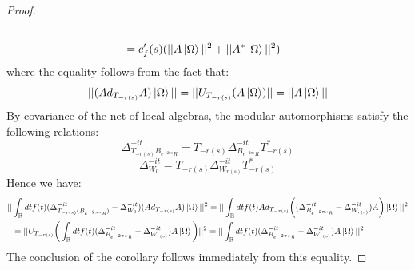 \documentclass[a4paper,11pt]{article}
\theoremstyle{definition}
\begin{document}
{\begin{proof}
\begin{align}
\begin{split}
            \\&
            =c'_f(s)(||A\ket{\Omega}||^2 + ||A^*\ket{\Omega}||^2)
        \end{split}
    \end{align}
    where the equality follows from the fact that:
    \begin{equation}
        ||(Ad_{T_{-r(s)}}A)\ket{\Omega}|| = ||U_{T_{-r(s)}}(A\ket{\Omega})|| = ||A\ket{\Omega}||
    \end{equation}
    By covariance of the net of local algebras, the modular automorphisms satisfy the following relations:
    \begin{equation}
        \Delta^{-it}_{T_{-r(s)}B_{e^{-2\pi s}R}} = T_{-r(s)}\Delta^{-it}_{B_{e^{-2\pi s}R}}T^*_{-r(s)}
    \end{equation}
    \begin{equation}
        \Delta^{-it}_{W_0} = T_{-r(s)}\Delta_{W_{r(s)}}^{-it}T^*_{-r(s)}
    \end{equation}
    Hence we have:
    \begin{align}
        \begin{split}
            ||&\int_\mathbb{R} dt f(t)(\Delta^{-it}_{T_{-r(s)}(B_{e^{-2\pi s}R})} - \Delta^{-it}_{W_0})(Ad_{T_{-r(s)}}A)\ket{\Omega}||^2 = ||\int_\mathbb{R} dt f(t)Ad_{T_{-r(s)}}\bigg((\Delta^{-it}_{B_{e^{-2\pi s}R}} - \Delta_{W_{r(s)}}^{-it})A\bigg)\ket{\Omega}||^2
            \\&
            =||U_{T_{-r(s)}}\bigg(\int_\mathbb{R} dt f(t)(\Delta^{-it}_{B_{e^{-2\pi s}R}} - \Delta^{-it}_{W_{r(s)}})A\ket{\Omega}\bigg)||^2
            =||\int_\mathbb{R} dt f(t)(\Delta^{-it}_{B_{e^{-2\pi s}R}} - \Delta^{-it}_{W_{r(s)}})A\ket{\Omega}||^2
        \end{split}
    \end{align}
    The conclusion of the corollary follows immediately from this equality.
\end{proof}
}
\end{document}

